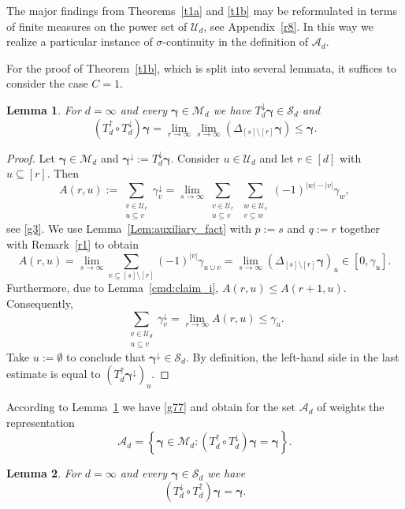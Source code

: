 \documentclass{article}
\newcommand{\bg}{{\boldsymbol{\gamma}}}
\newcommand{\U}  {\mathcal{U}}
\newcommand{\M}  {\mathcal{M}}
\newcommand{\SSS}{\mathcal{S}}
\newcommand{\A}{\mathcal{A}}
\newcommand{\lo}{\downarrow}
\newcommand{\up}{\uparrow}
\theoremstyle{plain}
\newtheorem{lemma}{Lemma}
\theoremstyle{definition}
\begin{document}
The major findings from Theorems~\ref{t1a} and \ref{t1b} may be
reformulated in terms of finite measures on the power set of
$\U_d$, see Appendix~\ref{r8}. 
In this way we realize a particular instance of $\sigma$-continuity
in the definition of $\A_d$. 

For the proof of Theorem~\ref{t1b}, which is split into
several lemmata, it suffices to consider the case $C=1$.

\begin{lemma}\label{l31}
For $d = \infty$ and every $\bg \in \M_d$
we have $T^\lo_d \bg \in \SSS_d$ and
\[
\left(T^\up_d \circ T^\lo_d\right) \bg 
=
\lim_{r \to \infty} 
\lim_{s \to \infty} \left( \Delta_{[s] \setminus [r]} \bg \right)
\leq \bg.
\]
\end{lemma}

\begin{proof}
Let $\bg \in \M_d$ and $\bg^\lo := T^\lo_d \bg$.
Consider $u\in \U_{d}$ and let $r \in [d]$ with 
$u \subseteq [r]$.
Then
\[
A(r,u) :=
\sum_{\substack{v\in \U_r \\ u \subseteq v}} \gamma^{\lo}_v
=   \lim_{s\to \infty} \sum_{\substack{v\in \U_r \\ u \subseteq v}}
\sum_{\substack{w\in \U_s \\ v \subseteq w}} (-1)^{|w|-|v|} \gamma_w,
\]
see \eqref{g3}.
We use 
Lemma~\ref{Lem:auxiliary_fact} with $p := s$ and $q := r$
together with Remark~\ref{r1} to obtain
\[
A(r,u)
= \lim_{s\to \infty} \sum_{v \subseteq [s] \setminus [r]}
(-1)^{|v|} \gamma_{u \cup v}
=
\lim_{s \to \infty} \left( \Delta_{[s] \setminus [r]} \bg \right)_u 
\in [0,\gamma_u].
\]
Furthermore, due to Lemma~\ref{cmd:claim_i},
$A(r,u) \leq A(r+1,u)$. Consequently, 
\[
\sum_{\substack{v\in \U_d \\ u \subseteq v}} 
\gamma^{\lo}_v
= \lim_{r \to \infty} A(r,u) \leq \gamma_u.
\]
Take $u := \emptyset$ to conclude that 
$\bg^\lo \in \SSS_d$.
By definition, the left-hand side in the last estimate is
equal to $(T^\up_d \bg^\lo)_u$.
\end{proof}

According to Lemma~\ref{l31} we have \eqref{g77} and obtain for 
the set $\A_d$ of weights the representation
\begin{equation}\label{eq:repAd}
\A_d = \left\{ \bg \in \M_d : 
(T^{\up}_{d} \circ T^{\lo}_{d}) \bg = \bg \right\}.
\end{equation}

\begin{lemma}\label{l30}
For $d = \infty$ and every $\bg \in \SSS_d$ 
we have
\[
(T^\lo_d \circ T^\up_d) \bg = \bg.
\]
\end{lemma}
\end{document}
